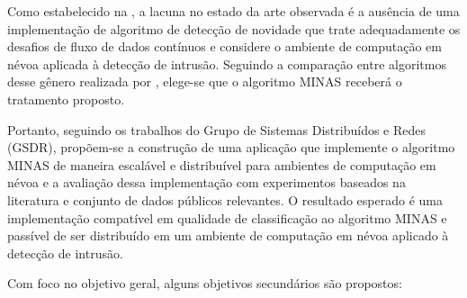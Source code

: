 
Como estabelecido na , a lacuna no estado da arte observada é
a ausência de uma implementação de algoritmo de detecção de
novidade que trate adequadamente os desafios de fluxo de dados contínuos e
considere o ambiente de computação em névoa aplicada à detecção de
intrusão.
Seguindo a comparação entre algoritmos desse gênero realizada por
, elege-se que o algoritmo MINAS \cite{Faria2016minas}
receberá o tratamento proposto.


Portanto, seguindo os trabalhos do Grupo de Sistemas Distribuídos e Redes
(GSDR), propõem-se a construção de uma aplicação que implemente o algoritmo MINAS
de maneira escalável e distribuível para ambientes de computação em névoa e a avaliação
dessa implementação com experimentos baseados na literatura e conjunto de dados
públicos relevantes.
O resultado esperado é uma implementação compatível em qualidade de
classificação ao algoritmo MINAS e passível de ser distribuído em um ambiente
de computação em névoa aplicado à detecção de intrusão.



% 

Com foco no objetivo geral, alguns objetivos secundários são propostos:




